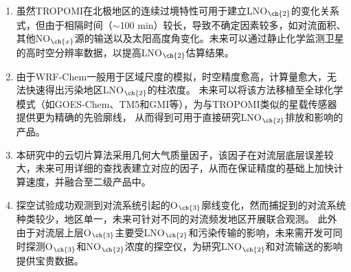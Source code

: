 \begin{enumerate}[label=（\arabic*）, labelindent=\parindent, nosep, leftmargin=0pt, widest=0, itemindent=*, topsep=0pt, partopsep=0pt, parsep=0pt]

\item 虽然TROPOMI在北极地区的连续过境特性可用于建立LNO$_{\ch{2}}$的变化关系式，但由于相隔时间（$\sim$100 min）较长，导致不确定因素较多，如对流面积、其他NO$_{\ch{x}}$源的输送以及太阳高度角变化。未来可以通过静止化学监测卫星的高时空分辨率数据，以提高LNO$_{\ch{2}}$估算结果。

\item 由于WRF-Chem一般用于区域尺度的模拟，时空精度愈高，计算量愈大，无法快速得出污染地区LNO$_{\ch{2}}$的柱浓度。
未来可以将该方法移植至全球化学模式（如GOES-Chem、TM5和GMI等），为与TROPOMI类似的星载传感器提供更为精确的先验廓线，
从而得到可用于直接研究LNO$_{\ch{2}}$排放和影响的产品。

\item 本研究中的云切片算法采用几何大气质量因子，该因子在对流层底层误差较大，未来可用详细的查找表建立对应的因子，从而在保证精度的基础上加快计算速度，并融合至二级产品中。

\item 探空试验成功观测到对流系统引起的O$_{\ch{3}}$廓线变化，然而捕捉到的对流系统种类较少，地区单一，未来可针对不同的对流频发地区开展联合观测。
此外由于对流层上层O$_{\ch{3}}$主要受LNO$_{\ch{2}}$和污染传输的影响，未来需开发可同时探测O$_{\ch{3}}$和NO$_{\ch{2}}$浓度的探空仪，为研究LNO$_{\ch{2}}$和对流输送的影响提供宝贵数据。

\end{enumerate}
